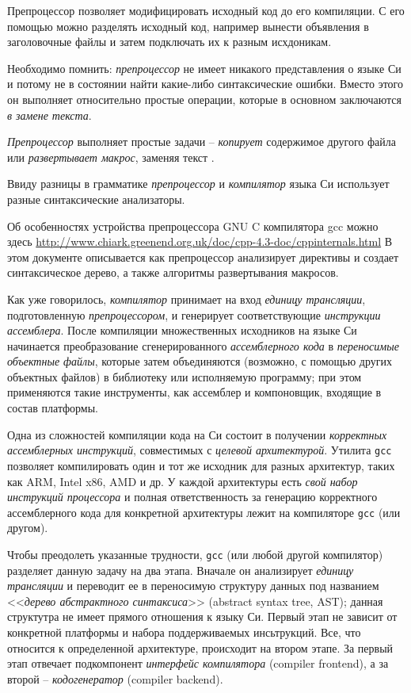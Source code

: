 \documentclass[%
	11pt,
	a4paper,
	utf8,
		]{article}
\begin{document}
Препроцессор позволяет модифицировать исходный код до его компиляции. С его помощью можно разделять исходный код, например вынести объявления в заголовочные файлы и затем подключать их к разным исхдоникам.

Необходимо помнить: \emph{препроцессор} не имеет никакого представления о языке Си и потому не в состоянии найти какие-либо синтаксические ошибки. Вместо этого он выполняет относительно простые операции, которые в основном заключаются \emph{в замене текста}.

\emph{Препроцессор} выполняет простые задачи -- \emph{копирует} содержимое другого файла или \emph{развертывает макрос}, заменяя текст \cite[]{amini-extreme-c:2022}.

Ввиду разницы в грамматике \emph{препроцессор} и \emph{компилятор} языка Си использует разные синтаксические анализаторы.

Об особенностях устройства препроцессора GNU C компилятора gcc можно здесь \url{http://www.chiark.greenend.org.uk/doc/cpp-4.3-doc/cppinternals.html} В этом документе описывается как препроцессор анализирует директивы и создает синтаксическое дерево, а также алгоритмы развертывания макросов.

Как уже говорилось, \emph{компилятор} принимает на вход \emph{единицу трансляции}, подготовленную \emph{препроцессором}, и генерирует соответствующие \emph{инструкции ассемблера}. После компиляции множественных исходников на языке Си начинается преобразование сгенерированного \emph{ассемблерного кода} в \emph{переносимые объектные файлы}, которые затем объединяются (возможно, с помощью других объектных файлов) в библиотеку или исполняемую программу; при этом применяются такие инструменты, как ассемблер и компоновщик, входящие в состав платформы.

Одна из сложностей компиляции кода на Си состоит в получении \emph{корректных ассемблерных инструкций}, совместимых с \emph{целевой архитектурой}. Утилита \verb|gcc| позволяет компилировать один и тот же исходник для разных архитектур, таких как ARM, Intel x86, AMD и др. У каждой архитектуры есть \emph{свой набор инструкций процессора} и полная ответственность за генерацию корректного ассемблерного кода для конкретной архитектуры лежит на компиляторе \verb|gcc| (или другом).

Чтобы преодолеть указанные трудности, \verb|gcc| (или любой другой компилятор) разделяет данную задачу на два этапа. Вначале он анализирует \emph{единицу трансляции} и переводит ее в переносимую структуру данных под названием <<\emph{дерево абстрактного синтаксиса}>> (abstract syntax tree, AST); данная структутра не имеет прямого отношения к языку Си. Первый этап не зависит от конкретной платформы и набора поддерживаемых инсьтрукций. Все, что относится к определенной архитектуре, происходит на втором этапе. За первый этап отвечает подкомпонент \emph{интерфейс компилятора} (compiler frontend), а за второй -- \emph{кодогенератор} (compiler backend).
\end{document}
